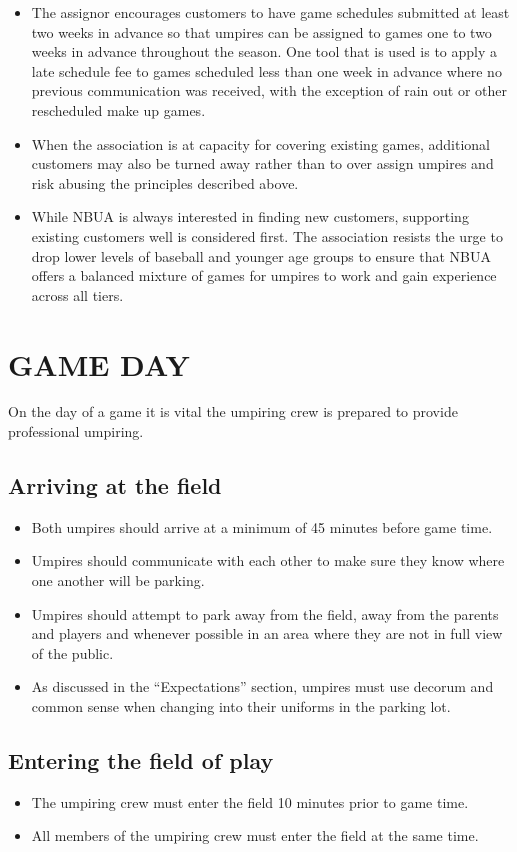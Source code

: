 \documentclass[letterpaper,11pt,colorlinks=true,allcolors=blue]{article}
\begin{document}
\begin{itemize}
\item The assignor encourages customers to have game schedules submitted at least two weeks in advance so that umpires can be assigned to games one to two weeks in advance throughout the season.  One tool that is used is to apply a late schedule fee to games scheduled less than one week in advance where no previous communication was received, with the exception of rain out or other rescheduled make up games.
\item When the association is at capacity for covering existing games, additional customers may also be turned away rather than to over assign umpires and risk abusing the principles described above.
\item While NBUA is always interested in finding new customers, supporting existing customers well is considered first.  The association resists the urge to drop lower levels of baseball and younger age groups to ensure that NBUA offers a balanced mixture of games for umpires to work and gain experience across all tiers.
\end{itemize}

\newpage
\section{GAME DAY}
On the day of a game it is vital the umpiring crew is prepared to provide professional umpiring.

\subsection*{Arriving at the field}

\begin{itemize}
\item Both umpires should arrive at a minimum of 45 minutes before game time.
\item Umpires should communicate with each other to make sure they know where one another will be parking.
\item Umpires should attempt to park away from the field, away from the parents and players and whenever possible in an area where they are not in full view of the public.
\item As discussed in the “Expectations” section, umpires must use decorum and common sense when changing into their uniforms in the parking lot.
\end{itemize}

\subsection*{Entering the field of play}
\begin{itemize}
\item The umpiring crew must enter the field 10 minutes prior to game time.
\item All members of the umpiring crew must enter the field at the same time. 
\end{itemize}
\end{document}
